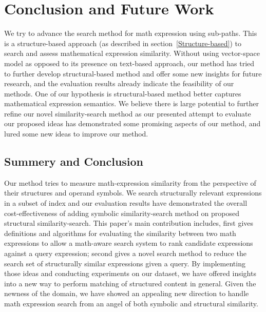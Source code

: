 \chapter{Conclusion and Future Work}
We try to advance the search method for math expression using sub-paths.
This is a structure-based approach (as described in section~\ref{Structure-based}) to search and assess mathematical expression similarity.
Without using vector-space model as opposed to its presence on text-based approach, our method has tried to further develop structural-based method and offer some new insights for future research, 
and the evaluation results already indicate the feasibility of our methods.
One of our hypothesis is structural-based method better captures mathematical expression semantics. 
We believe there is large potential to further refine our novel similarity-search method as our presented attempt to evaluate our proposed ideas has demonstrated some promising aspects of our method, and lured some new ideas to improve our method.

\section{Summery and Conclusion}
Our method tries to measure math-expression similarity from the perspective of their structures and operand symbols. 
We search structurally relevant expressions in a subset of index and our evaluation results have demonstrated the overall cost-effectiveness of adding symbolic similarity-search method on proposed structural similarity-search.
This paper's main contribution includes, 
first gives definitions and algorithms for evaluating the similarity between two math expressions to allow a math-aware search system to rank candidate expressions against a query expression;
second gives a novel search method to reduce the search set of structurally similar expressions given a query. 
By implementing those ideas and conducting experiments on our dataset, we have offered insights into a new way to perform matching of structured content in general.
Given the newness of the domain, we have showed an appealing new direction to handle math expression search from an angel of both symbolic and structural similarity. 

